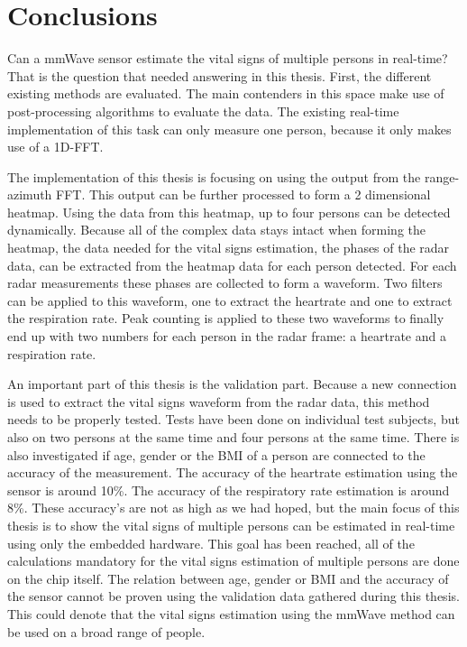 \chapter{Conclusions}
\label{chp:conclusions}

Can a mmWave sensor estimate the vital signs of multiple persons in real-time? That is the question that needed answering in this thesis. First, the different existing methods are evaluated. The main contenders in this space make use of post-processing algorithms to evaluate the data. The existing real-time implementation of this task can only measure one person, because it only makes use of a 1D-FFT. 

The implementation of this thesis is focusing on using the output from the range-azimuth FFT. This output can be further processed to form a 2 dimensional heatmap. Using the data from this heatmap, up to four persons can be detected dynamically. Because all of the complex data stays intact when forming the heatmap, the data needed for the vital signs estimation, the phases of the radar data, can be extracted from the heatmap data for each person detected. For each radar measurements these phases are collected to form a waveform. Two filters can be applied to this waveform, one to extract the heartrate and one to extract the respiration rate. Peak counting is applied to these two waveforms to finally end up with two numbers for each person in the radar frame: a heartrate and a respiration rate.

An important part of this thesis is the validation part. Because a new connection is used to extract the vital signs waveform from the radar data, this method needs to be properly tested. Tests have been done on individual test subjects, but also on two persons at the same time and four persons at the same time. There is also investigated if age, gender or the BMI of a person are connected to the accuracy of the measurement. The accuracy of the heartrate estimation using the sensor is around 10\%. The accuracy of the respiratory rate estimation is around 8\%. These accuracy's are not as high as we had hoped, but the main focus of this thesis is to show the vital signs of multiple persons can be estimated in real-time using only the embedded hardware. This goal has been reached, all of the calculations mandatory for the vital signs estimation of multiple persons are done on the chip itself. The relation between age, gender or BMI and the accuracy of the sensor cannot be proven using the validation data gathered during this thesis. This could denote that the vital signs estimation using the mmWave method can be used on a broad range of people. 

